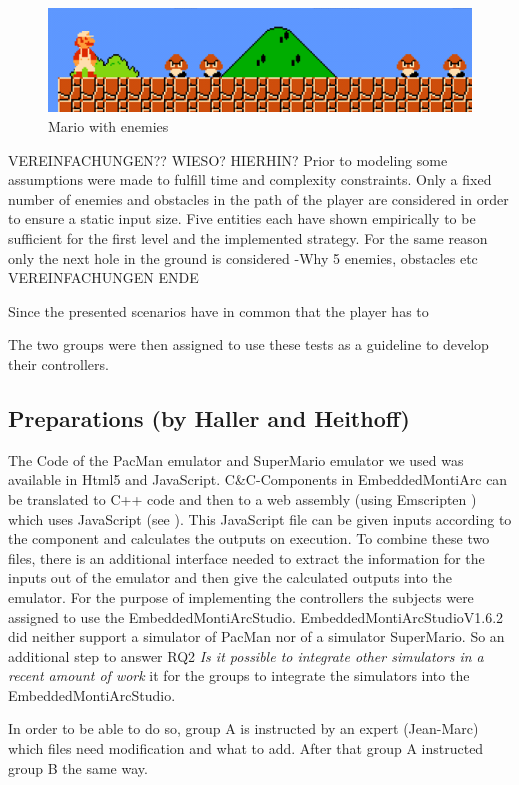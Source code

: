 \begin{figure}[!h]
	\centering
	\includegraphics[scale=0.55]{pictures/Mario4.PNG}
	\caption{Mario with enemies}
	\label{fig:marioFight}
\end{figure}


VEREINFACHUNGEN?? WIESO? HIERHIN?
Prior to modeling some assumptions were made to fulfill time and complexity constraints.
Only a fixed number of enemies and obstacles in the path of the player are considered in order to ensure a static input size. Five entities each have shown empirically to be sufficient for the first level and the implemented strategy. For the same reason only the next hole in the ground is considered
-Why 5 enemies, obstacles etc
VEREINFACHUNGEN ENDE

Since the presented scenarios have in common that the player has to 

The two groups were then assigned to use these tests as a guideline to develop their controllers.


\subsection{Preparations (by Haller and Heithoff)}
The Code of the PacMan emulator \cite{pacmanLink} and SuperMario emulator \cite{marioLink} we used was available in Html5 and JavaScript. C\&C-Components in EmbeddedMontiArc can be translated to C++ code and then to a web assembly (using Emscripten \cite{emscirpten}) which uses JavaScript (see \cite{bertram2017component}). This JavaScript file can be given inputs according to the component and calculates the outputs on execution. To combine these two files, there is an additional interface needed to extract the information for the inputs out of the emulator and then give the calculated outputs into the emulator.
For the purpose of implementing the controllers the subjects were assigned to use the EmbeddedMontiArcStudio.
EmbeddedMontiArcStudioV1.6.2 did neither support a simulator of PacMan nor of a simulator SuperMario. So an additional step to answer RQ2 \textit{Is it possible to integrate other simulators in a recent amount of work} it for the groups to integrate the simulators into the EmbeddedMontiArcStudio.

In order to be able to do so, group A is instructed by an expert (Jean-Marc) which files need modification and what to add. After that group A instructed group B the same way.

